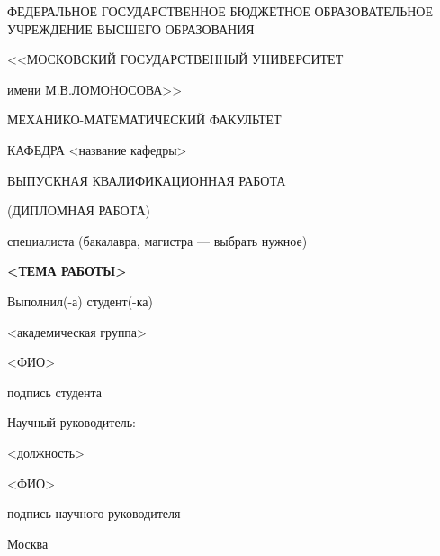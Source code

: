 \begin{titlepage}
  \begin{center}
    ФЕДЕРАЛЬНОЕ ГОСУДАРСТВЕННОЕ БЮДЖЕТНОЕ ОБРАЗОВАТЕЛЬНОЕ УЧРЕЖДЕНИЕ ВЫСШЕГО ОБРАЗОВАНИЯ

    <<МОСКОВСКИЙ ГОСУДАРСТВЕННЫЙ УНИВЕРСИТЕТ

    имени М.В.ЛОМОНОСОВА>>

    \vspace{0.7cm}

    МЕХАНИКО-МАТЕМАТИЧЕСКИЙ ФАКУЛЬТЕТ

    \vspace{0.7cm}

    КАФЕДРА <название кафедры>

    \vspace{3cm}

    ВЫПУСКНАЯ КВАЛИФИКАЦИОННАЯ РАБОТА
  
    (ДИПЛОМНАЯ РАБОТА)
  
    специалиста (бакалавра, магистра — выбрать нужное)

    \vspace{0.7cm}

    \textbf{<ТЕМА РАБОТЫ>}

  \end{center}

  \vspace{2cm}

  \hfill
  \begin{minipage}{0.5\textwidth}
    Выполнил(-а) студент(-ка)

    <академическая группа>

    <ФИО>

    \vspace{1cm}

    \underline{\hspace{4cm}}

    подпись студента

    \vspace{0.5cm}

    Научный руководитель:

    <должность>

    <ФИО>

    \vspace{1cm}

    \underline{\hspace{4cm}}

    подпись научного руководителя
 \end{minipage}

  \vfill

  \begin{center}
    \large Москва

    \the\year
  \end{center}

\end{titlepage}
